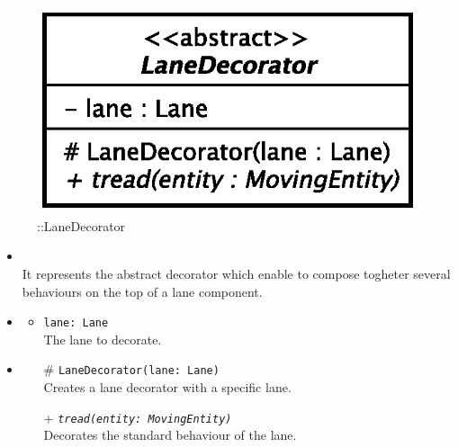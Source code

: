 \begin{figure}[h]
\centering
\includegraphics[scale=0.6,keepaspectratio]{images/solution/app/backend/lane_decorator.eps}
\caption{\pReactiveComponentLaneDecoration::LaneDecorator}
\label{fig:sd-app-lane_decorator}
\end{figure}
\FloatBarrier
\begin{itemize}
  \item \textbf{\descr} \\
    It represents the abstract decorator which enable to compose togheter several
behaviours on the top of a lane component. 
  \item \textbf{\attrs}
  \begin{itemize}
    \item \texttt{lane: Lane} \\
The lane to decorate.
  \end{itemize}
  \item \textbf{\ops}
   \begin{itemize} 
   \item[\#] \texttt{LaneDecorator(lane: Lane)} \\
Creates a lane decorator with a specific lane.
    \item[+] \texttt{\textit{tread(entity: MovingEntity)}} \\
Decorates the standard behaviour of the lane.  
  \end{itemize}
\end{itemize}
